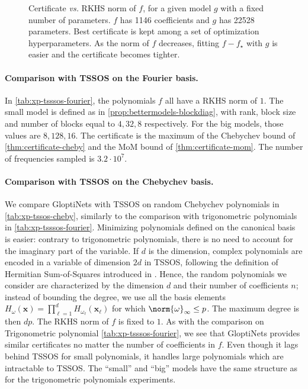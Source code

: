 \documentclass{article}
\begin{document}
\begin{figure}
  \centering
  
  \caption{Certificate \emph{vs.} RKHS norm of $f$, for a given model $g$ with a fixed number of parameters. $f$ has 1146 coefficients and $g$ has 22528 parameters. Best certificate is kept among a set of optimization hyperparameters. As the norm of $f$ decreases, fitting $f - f_\star$ with $g$ is easier and the certificate becomes tighter.}
  \label{fig:xp-hnorm2}
\end{figure}

\paragraph{Comparison with TSSOS on the Fourier basis.}
In \cref{tab:xp-tsssos-fourier}, the polynomials $f$ all have a RKHS norm of $1$. The small model is defined as in \cref{prop:bettermodels-blockdiag}, with rank, block size and number of blocks equal to $4, 32, 8$ respectively. For the big models, those values are $8, 128, 16$. The certificate is the maximum of the Chebychev bound of \cref{thm:certificate-cheby} and the MoM bound of \cref{thm:certificate-mom}. The number of frequencies sampled is $3.2 \cdot 10^7$.

\paragraph{Comparison with TSSOS on the Chebychev basis.}
We compare GloptiNets with TSSOS on random Chebychev polynomials in \cref{tab:xp-tssos-cheby}, similarly to the comparison with trigonometric polynomials in \cref{tab:xp-tsssos-fourier}. Minimizing polynomials defined on the canonical basis is easier: contrary to trigonometric polynomials, there is no need to account for the imaginary part of the variable. If $d$ is the dimension, complex polynomials are encoded in a variable of dimension $2d$ in TSSOS, following the definition of Hermitian Sum-of-Squares introduced in \cite{joszLasserreHierarchyLarge2018a}. Hence, the random polynomials we consider are characterized by the dimension $d$ and their number of coefficients $n$; instead of bounding the degree, we use all the basis elements $H_{\omega}(\mathbf{x}) = \prod_{\ell = 1}^d H_{\omega_\ell} (\mathbf{x}_\ell)$ for which $\norm{\omega}_\infty \leq p$. The maximum degree is then $dp$. The RKHS norm of $f$ is fixed to $1$. As with the comparison on Trigonometric polynomial \cref{tab:xp-tsssos-fourier}, we see that GloptiNets provides similar certificates no matter the number of coefficients in $f$. Even though it lags behind TSSOS for small polynomials, it handles large polynomials which are intractable to TSSOS. The ``small'' and ``big'' models have the same structure as for the trigonometric polynomials experiments.
\end{document}
